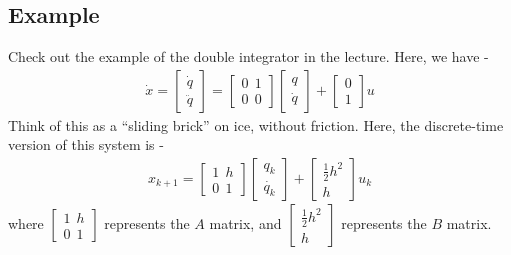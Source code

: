 \subsection{Example}
Check out the example of the double integrator in the lecture. Here, we have - 
\begin{align}
    \dot{x} = \begin{bmatrix}
        \dot{q} \\
        \ddot{q} 
    \end{bmatrix}
    = 
    \begin{bmatrix}
        0 \ \ 1  \\
        0 \ \ 0
    \end{bmatrix}
    \begin{bmatrix}
        q \\
        \dot{q} 
    \end{bmatrix}
    + 
    \begin{bmatrix}
        0 \\
        1
    \end{bmatrix}
    u 
\end{align}
Think of this as a ``sliding brick'' on ice, without friction. Here, the discrete-time version of this system is - 
\begin{align}
    x_{k+1} = 
    \begin{bmatrix}
        1 \ \ h  \\
        0 \ \ 1
    \end{bmatrix}
    \begin{bmatrix}
        q_k \\
        \dot{q_k} 
    \end{bmatrix}
    + 
    \begin{bmatrix}
        \frac{1}{2} h^2 \\
        h
    \end{bmatrix}
    u_k 
\end{align} 
where $    \begin{bmatrix}
        1 \ \ h  \\
        0 \ \ 1
    \end{bmatrix}$ represents the $A$ matrix, and $    \begin{bmatrix}
        \frac{1}{2} h^2 \\
        h
    \end{bmatrix}$ represents the $B$ matrix.
    

